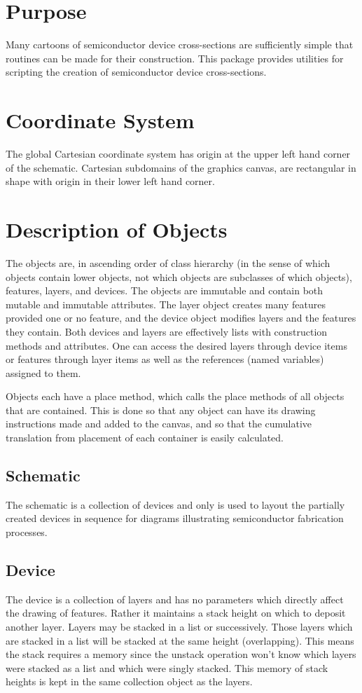 \documentclass{article}
\begin{document}
\section{Purpose}
Many cartoons of semiconductor device cross-sections are sufficiently simple that routines can be made for their construction. This package provides utilities for scripting the creation of semiconductor device cross-sections. 

\section{Coordinate System}
The global Cartesian coordinate system has origin at the upper left hand corner of the schematic. Cartesian subdomains of the graphics canvas, are rectangular in shape with origin in their lower left hand corner.

\section{Description of Objects}\label{sec:oop}

The objects are, in ascending order of class hierarchy (in the sense of which objects contain lower objects, not which objects are subclasses of which objects), features, layers, and devices. The objects are immutable and contain both mutable and immutable attributes. The layer object creates many features provided one or no feature, and the device object modifies layers and the features they contain. Both devices and layers are effectively lists with construction methods and attributes. One can access the desired layers through device items or features through layer items as well as the references (named variables) assigned to them.

Objects each have a place method, which calls the place methods of all objects that are contained. This is done so that any object can have its drawing instructions made and added to the canvas, and so that the cumulative translation from placement of each container is easily calculated.

\subsection{Schematic}
The schematic is a collection of devices and only is used to layout the partially created devices in sequence for diagrams illustrating semiconductor fabrication processes.

\subsection{Device}
The device is a collection of layers and has no parameters which directly affect the drawing of features. Rather it maintains a stack height on which to deposit another layer. Layers may be stacked in a list or successively. Those layers which are stacked in a list will be stacked at the same height (overlapping). This means the stack requires a memory since the unstack operation won't know which layers were stacked as a list and which were singly stacked. This memory of stack heights is kept in the same collection object as the layers. 
\end{document}
